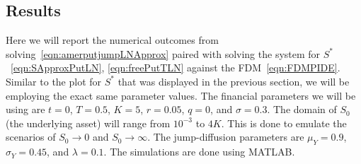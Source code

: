 \subsection{Results}
Here we will report the numerical outcomes from solving~\eqref{eqn:amerputjumpLNApprox} paired with solving the system for $S^*$~\eqref{eqn:SApproxPutLN}, \eqref{eqn:freePutTLN} against the FDM~\eqref{eqn:FDMPIDE}. Similar to the plot for $S^*$ that was displayed in the previous section, we will be employing the exact same parameter values. The financial parameters we will be using are $t=0$, $T=0.5$, $K = 5$, $r=0.05$, $q=0$, and $\sigma = 0.3$. The domain of $S_0$ (the underlying asset) will range from $10^{-3}$ to $4K$. This is done to emulate the scenarios of $S_0 \rightarrow 0$ and $S_0 \rightarrow \infty$. The jump-diffusion parameters are $\mu_Y = 0.9$, $\sigma_Y = 0.45$, and $\lambda = 0.1$. The simulations are done using MATLAB.

